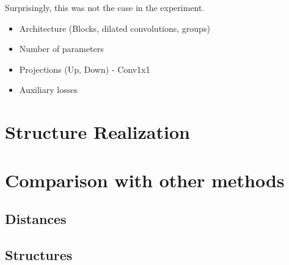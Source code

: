     
Surprisingly, this was not the case in the experiment.
    
\begin{itemize}
    \item Architecture (Blocks, dilated convolutions, groups)
    \item Number of parameters
    \item Projections (Up, Down) - Conv1x1
    \item Auxiliary losses
\end{itemize}
        
\section{Structure Realization}

\section{Comparison with other methods}
\subsection{Distances}
\subsection{Structures}
